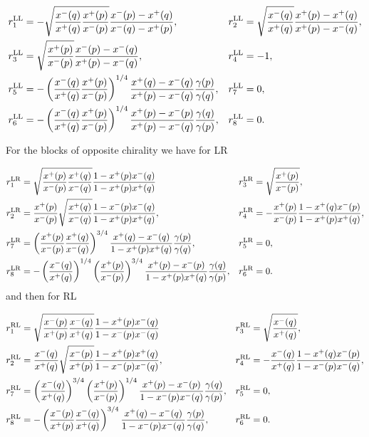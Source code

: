 \documentclass[12pt,a4paper]{article}
\numberwithin{equation}{section}
\begin{document}
\begin{align}
& r_1^{{\rm LL}}=-\sqrt{\frac{x^-(q)}{x^+(q)}\frac{x^+(p)}{x^-(p)}} \frac{x^-(p)-x^+(q)}{x^-(q)-x^+(p)},
&& r_2^{{\rm LL}}=\sqrt{\frac{x^-(q)}{x^+(q)}}\frac{x^+(p)-x^+(q)}{x^+(p)-x^-(q)},\nonumber\\
& r_3^{{\rm LL}}=\sqrt{\frac{x^+(p)}{x^-(p)}}\frac{x^-(p)-x^-(q)}{x^+(p)-x^-(q)},
&& r_4^{{\rm LL}}=-1,\nonumber\\
& r_5^{{\rm LL}}=-\left(\frac{x^-(q)}{x^+(q)}\frac{x^+(p)}{x^-(p)}\right)^{1/4}\frac{x^+(q)-x^-(q)}{x^+(p)-x^-(q)}\frac{\gamma(p)}{\gamma(q)},
&& r_7^{{\rm LL}}=0,\nonumber\\
& r_6^{{\rm LL}}=-\left(\frac{x^-(q)}{x^+(q)}\frac{x^+(p)}{x^-(p)}\right)^{1/4}\frac{x^+(p)-x^-(p)}{x^+(p)-x^-(q)}\frac{\gamma(q)}{\gamma(p)}, && r_8^{{\rm LL}}=0.
\end{align}

For the blocks of opposite chirality we have for LR

\begin{align}
& r_1^{{\rm LR}}=\sqrt{\frac{x^+(p)}{x^-(p)}\frac{x^+(q)}{x^-(q)}}\frac{1-x^+(p)x^-(q)}{1-x^+(p)x^+(q)} && 
r_3^{{\rm LR}}=\sqrt{\frac{x^+(p)}{x^-(p)}},\nonumber\\
&r_2^{{\rm LR}}=\frac{x^+(p)}{x^-(p)}\sqrt{\frac{x^+(q)}{x^-(q)}}\frac{1-x^-(p)x^-(q)}{1-x^+(p)x^+(q)}, && r_4^{{\rm LR}}=-\frac{x^+(p)}{x^-(p)}\frac{1-x^+(q)x^-(p)}{1-x^+(p)x^+(q)},\nonumber\\
& r_7^{{\rm LR}}=\left(\frac{x^+(p)}{x^-(p)}\frac{x^+(q)}{x^-(q)}\right)^{3/4}\frac{x^+(q)-x^-(q)}{1-x^+(p)x^+(q)}\frac{\gamma(p)}{\gamma(q)}, && r_5^{{\rm LR}}=0,\nonumber\\
& r_8^{{\rm LR}}=-\left(\frac{x^-(q)}{x^+(q)}\right)^{1/4}\left(\frac{x^+(p)}{x^-(p)}\right)^{3/4}\frac{x^+(p)-x^-(p)}{1-x^+(p)x^+(q)}\frac{\gamma(q)}{\gamma(p)}, && r_6^{{\rm LR}}=0.
\end{align}
and then for RL

\begin{align}
& r_1^{{\rm RL}}=\sqrt{\frac{x^-(p)}{x^+(p)}\frac{x^-(q)}{x^+(q)}}\frac{1-x^+(p)x^-(q)}{1-x^-(p)x^-(q)} && 
r_3^{{\rm RL}}=\sqrt{\frac{x^-(q)}{x^+(q)}},\nonumber\\
&r_2^{{\rm RL}}=\frac{x^-(q)}{x^+(q)}\sqrt{\frac{x^-(p)}{x^+(p)}}\frac{1-x^+(p)x^+(q)}{1-x^-(p)x^-(q)}, && r_4^{{\rm RL}}=-\frac{x^-(q)}{x^+(q)}\frac{1-x^+(q)x^-(p)}{1-x^-(p)x^-(q)},\nonumber\\
& r_7^{{\rm RL}}=\left(\frac{x^-(q)}{x^+(q)}\right)^{3/4}\left(\frac{x^+(p)}{x^-(p)}\right)^{1/4}\frac{x^+(p)-x^-(p)}{1-x^-(p)x^-(q)}\frac{\gamma(q)}{\gamma(p)}, && r_5^{{\rm RL}}=0,\nonumber\\
& r_8^{{\rm RL}}=-\left(\frac{x^-(p)}{x^+(p)}\frac{x^-(q)}{x^+(q)}\right)^{3/4}\frac{x^+(q)-x^-(q)}{1-x^-(p)x^-(q)}\frac{\gamma(p)}{\gamma(q)}, && r_6^{{\rm RL}}=0.
\end{align}
\end{document}
